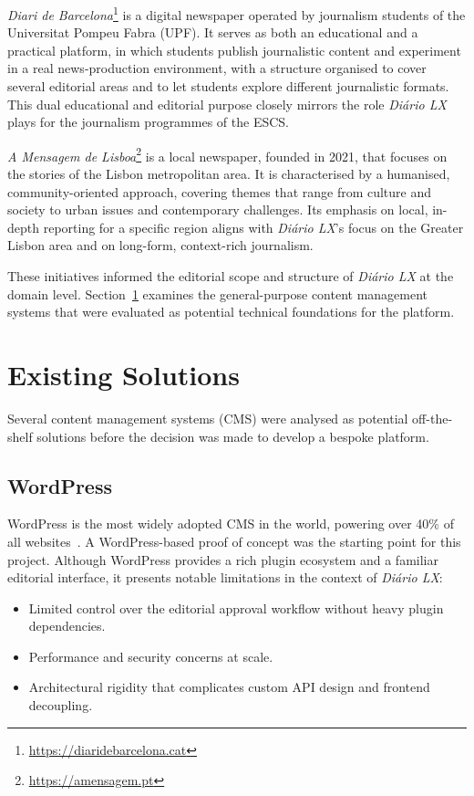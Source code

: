 \textit{Diari de Barcelona}\footnote{\url{https://diaridebarcelona.cat}} is a digital newspaper operated by journalism students of the
Universitat Pompeu Fabra (UPF). It serves as both an educational and a practical
platform, in which students publish journalistic content and experiment in a real
news-production environment, with a structure organised to cover several editorial areas
and to let students explore different journalistic formats. This dual educational and
editorial purpose closely mirrors the role \textit{Diário LX} plays for the journalism
programmes of the ESCS.

\textit{A Mensagem de Lisboa}\footnote{\url{https://amensagem.pt}} is a local newspaper, founded in 2021, that focuses on the
stories of the Lisbon metropolitan area. It is characterised by a humanised,
community-oriented approach, covering themes that range from culture and society to
urban issues and contemporary challenges. Its emphasis on local, in-depth reporting for
a specific region aligns with \textit{Diário LX}'s focus on the Greater Lisbon area and
on long-form, context-rich journalism.

These initiatives informed the editorial scope and structure of \textit{Diário LX} at the
domain level. Section~\ref{sec:background_existing} examines the general-purpose content
management systems that were evaluated as potential technical foundations for the
platform.

\section{Existing Solutions} \label{sec:background_existing}

Several content management systems (CMS) were analysed as potential off-the-shelf
solutions before the decision was made to develop a bespoke platform.

\subsection{WordPress} \label{sec:background_wordpress}

WordPress is the most widely adopted CMS in the world, powering over 40\% of all
websites~\cite{wordpress_stats}. A WordPress-based proof of concept was the starting
point for this project. Although WordPress provides a rich plugin ecosystem and a
familiar editorial interface, it presents notable limitations in the context of
\textit{Diário LX}:

\begin{itemize}
      \item Limited control over the editorial approval workflow without heavy plugin
            dependencies.
      \item Performance and security concerns at scale.
      \item Architectural rigidity that complicates custom API design and frontend
            decoupling.
\end{itemize}

